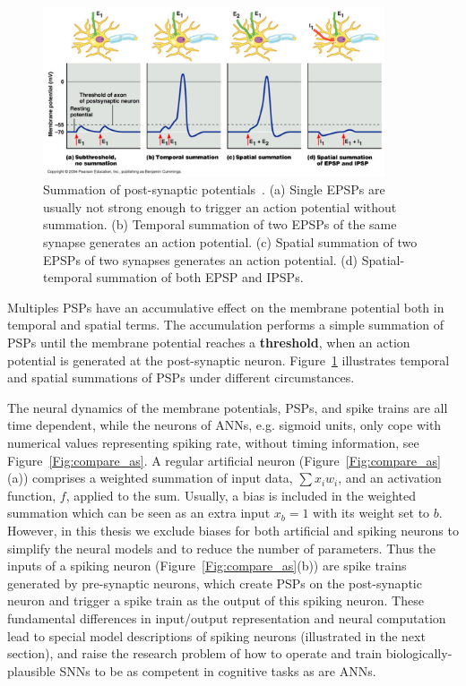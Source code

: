 \begin{figure}[bt!]
	\centering
	\includegraphics[width=0.9\textwidth]{pics_snn/psp.png}
	\caption{Summation of post-synaptic potentials~\citep{reece2011campbell}. 
		(a) Single EPSPs are usually not strong enough to trigger an action potential without summation. (b) Temporal summation of two EPSPs of the same synapse generates an action potential. (c) Spatial summation of two EPSPs of two synapses generates an action potential. (d) Spatial-temporal summation of both EPSP and IPSPs.
	}
	\label{Fig:psp_sum}
\end{figure}

Multiples PSPs have an accumulative effect on the membrane potential both in temporal and spatial terms.
The accumulation performs a simple summation of PSPs until the membrane potential reaches a \textbf{threshold}, when an action potential is generated at the post-synaptic neuron.
Figure~\ref{Fig:psp_sum} illustrates temporal and spatial summations of PSPs under different circumstances.

The neural dynamics of the membrane potentials, PSPs, and spike trains are all time dependent, while the neurons of ANNs, e.g. sigmoid units, only cope with numerical values representing spiking rate, without timing information, see Figure~\ref{Fig:compare_as}.
A regular artificial neuron (Figure~\ref{Fig:compare_as}(a)) comprises a weighted summation of input data, $\sum x_i w_i$, and an activation function, $f$, applied to the sum. Usually, a bias is included in the weighted summation which can be seen as an extra input $x_b = 1$ with its weight set to $b$.
However, in this thesis we exclude biases for both artificial and spiking neurons to simplify the neural models and to reduce the number of parameters.
Thus the inputs of a spiking neuron (Figure~\ref{Fig:compare_as}(b)) are spike trains generated by pre-synaptic neurons, which create PSPs on the post-synaptic neuron and trigger a spike train as the output of this spiking neuron.
These fundamental differences in input/output representation and neural computation lead to special model descriptions of spiking neurons (illustrated in the next section), and raise the research problem of how to operate and train biologically-plausible SNNs to be as competent in cognitive tasks as are ANNs.

